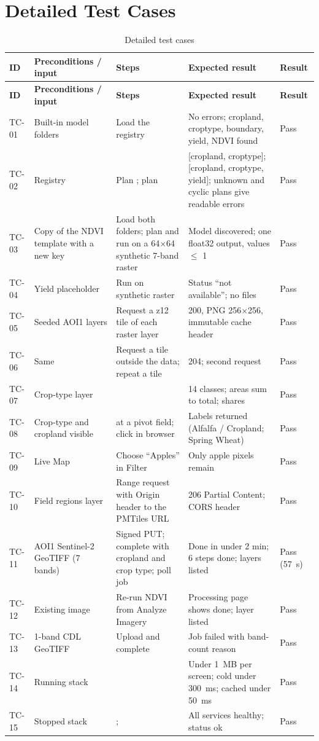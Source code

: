 \chapter{Detailed Test Cases}\label{app:tests}
\begingroup\small
\begin{longtable}{L{1.0cm} L{3.0cm} L{4.3cm} L{3.3cm} L{1.1cm}}
\caption{Detailed test cases}\label{tab:testdetail}\\
\toprule
\textbf{ID} & \textbf{Preconditions / input} & \textbf{Steps} & \textbf{Expected result} & \textbf{Result}\\
\midrule\endfirsthead
\toprule
\textbf{ID} & \textbf{Preconditions / input} & \textbf{Steps} & \textbf{Expected result} & \textbf{Result}\\
\midrule\endhead
\bottomrule\endlastfoot
TC-01 & Built-in model folders & Load the registry & No errors; cropland, croptype, boundary, yield, NDVI found & Pass\\
TC-02 & Registry & Plan ; plan  & [cropland, croptype]; [cropland, croptype, yield]; unknown and cyclic plans give readable errors & Pass\\
TC-03 & Copy of the NDVI template with a new key & Load both folders; plan and run on a 64$\times$64 synthetic 7-band raster & Model discovered; one float32 output, values $\leq$ 1 & Pass\\
TC-04 & Yield placeholder & Run on synthetic raster & Status ``not available''; no files & Pass\\
TC-05 & Seeded AOI1 layers & Request a z12 tile of each raster layer & 200, PNG 256$\times$256, immutable cache header & Pass\\
TC-06 & Same & Request a tile outside the data; repeat a tile & 204; second request  & Pass\\
TC-07 & Crop-type layer &  & 14 classes; areas sum to total; shares & Pass\\
TC-08 & Crop-type and cropland visible &  at a pivot field; click in browser & Labels returned (Alfalfa / Cropland; Spring Wheat) & Pass\\
TC-09 & Live Map & Choose ``Apples'' in Filter & Only apple pixels remain & Pass\\
TC-10 & Field regions layer & Range request with Origin header to the PMTiles URL & 206 Partial Content; CORS header & Pass\\
TC-11 & AOI1 Sentinel-2 GeoTIFF (7 bands) & Signed PUT; complete with cropland and crop type; poll job & Done in under 2 min; 6 steps done; layers listed & Pass (57~s)\\
TC-12 & Existing image & Re-run NDVI from Analyze Imagery & Processing page shows done; layer listed & Pass\\
TC-13 & 1-band CDL GeoTIFF & Upload and complete & Job failed with band-count reason & Pass\\
TC-14 & Running stack &  & Under 1~MB per screen; cold under 300~ms; cached under 50~ms & Pass\\
TC-15 & Stopped stack & ;  & All services healthy; status ok & Pass\\
\end{longtable}
